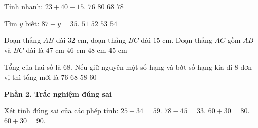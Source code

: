 \begin{ex} %
Tính nhanh: $23 + 40 + 15$.
\choice
{$76$}
{$80$}
{$68$}
{\True $78$}
\end{ex}

\begin{ex} %
Tìm $y$ biết: $87 - y = 35$.
\choice
{$51$}
{\True $52$}
{$53$}
{$54$}
\end{ex}

\begin{ex} %
Đoạn thẳng $AB$ dài $32\text{ cm}$, đoạn thẳng $BC$ dài $15\text{ cm}$. Đoạn thẳng $AC$ gồm $AB$ và $BC$ dài là
\choice
{\True $47\text{ cm}$}
{$46\text{ cm}$}
{$48\text{ cm}$}
{$45\text{ cm}$}
\end{ex}

\begin{ex} %
Tổng của hai số là 68. Nếu giữ nguyên một số hạng và bớt số hạng kia đi 8 đơn vị thì tổng mới là
\choice
{$76$}
{$68$}
{$58$}
{\True $60$}
\end{ex}

\textbf{Phần 2. Trắc nghiệm đúng sai}

\begin{ex} %
Xét tính đúng sai của các phép tính:
\choiceTF
{\True $25 + 34 = 59$.}
{\True $78 - 45 = 33$.}
{$60 + 30 = 80$.}
{\True $60 + 30 = 90$.}
\end{ex}

